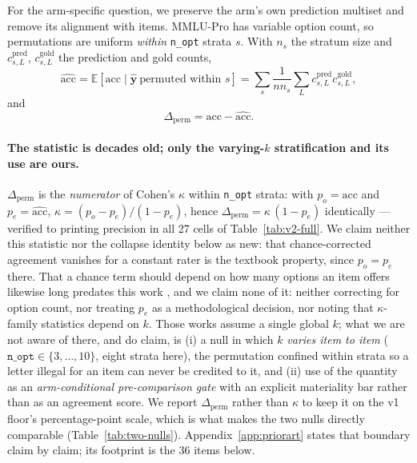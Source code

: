For the arm-specific question, we preserve the arm's own prediction multiset and remove its alignment with items. MMLU-Pro has variable option count, so permutations are uniform \emph{within} \texttt{n\_opt} strata $s$. With $n_{s}$ the stratum size and $c^{\mathrm{pred}}_{s,L}$, $c^{\mathrm{gold}}_{s,L}$ the prediction and gold counts,
\begin{equation}
\widehat{\mathrm{acc}}
=\mathbb{E}[\mathrm{acc}\mid \hat{\boldsymbol y}\ \text{permuted within }s]
=\sum_s\frac{1}{n n_{s}}\sum_L c^{\mathrm{pred}}_{s,L}c^{\mathrm{gold}}_{s,L},
\end{equation}
and
\begin{equation}
    \Delta_{\mathrm{perm}}=\mathrm{acc}-\widehat{\mathrm{acc}}.
\end{equation}

\paragraph{The statistic is decades old; only the varying-$k$ stratification and its use are ours.}
$\Delta_{\mathrm{perm}}$ is the \emph{numerator} of Cohen's $\kappa$ within \texttt{n\_opt}
strata: with $p_o=\mathrm{acc}$ and $p_e=\widehat{\mathrm{acc}}$, $\kappa=(p_o-p_e)/(1-p_e)$,
hence $\Delta_{\mathrm{perm}}=\kappa\,(1-p_e)$ identically --- verified to printing precision in
all 27 cells of Table~\ref{tab:v2-full}. We claim neither this statistic nor the collapse
identity below as new: that chance-corrected agreement vanishes for a constant rater is the
textbook property, since $p_o=p_e$ there. That a chance term should depend on how many options
an item offers likewise long predates this work
\citep{bennett1954communications,brennan1981kappa,frary1988formula,brenner1996weightedkappa,%
devries2008pooledkappa}, and we claim none of it: neither correcting for option count, nor treating
$p_e$ as a methodological decision, nor noting that $\kappa$-family statistics depend on $k$. Those
works assume a single global $k$; what we are not aware of there, and do claim, is (i) a null in
which $k$ \emph{varies item to item} ($\texttt{n\_opt}\in\{3,\dots,10\}$, eight strata here), the
permutation confined within strata so a letter illegal for an item can never be credited to it, and
(ii) use of the quantity as an \emph{arm-conditional pre-comparison gate} with an explicit
materiality bar rather than as an agreement score. We report $\Delta_{\mathrm{perm}}$ rather than
$\kappa$ to keep it on the v1 floor's percentage-point scale, which is what makes the two nulls
directly comparable (Table~\ref{tab:two-nulls}). Appendix~\ref{app:priorart} states that boundary
claim by claim; its footprint is the $36$ items below.

